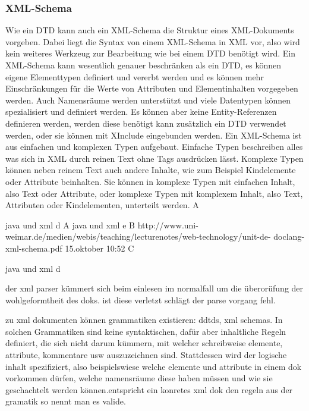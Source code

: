 \subsubsection*{XML-Schema}
Wie ein DTD kann auch ein XML-Schema die Struktur eines XML-Dokuments vorgeben. Dabei liegt die Syntax von einem XML-Schema in XML vor, also wird kein weiteres Werkzeug zur Bearbeitung wie bei einem DTD benötigt wird. Ein XML-Schema kann wesentlich genauer beschränken als ein DTD, es können eigene Elementtypen definiert und vererbt werden und es können mehr Einschränkungen für die Werte von Attributen und Elementinhalten vorgegeben werden. Auch Namensräume werden unterstützt und viele Datentypen können spezialisiert und definiert werden. Es können aber keine Entity-Referenzen definieren werden, werden diese benötigt kann zusätzlich ein DTD verwendet werden, oder sie können mit XInclude eingebunden werden. 
Ein XML-Schema ist aus einfachen und komplexen Typen aufgebaut. Einfache Typen beschreiben alles was sich in XML durch reinen Text ohne Tags ausdrücken lässt. Komplexe Typen können neben reinem Text auch andere Inhalte, wie zum Beispiel Kindelemente oder Attribute beinhalten. Sie können in komplexe Typen mit einfachen Inhalt, also Text oder Attribute, oder komplexe Typen mit komplexem Inhalt, also Text, Attributen oder Kindelementen, unterteilt werden. 
A


java und xml d A
java und xml e B
http://www.uni-weimar.de/medien/webis/teaching/lecturenotes/web-technology/unit-de-
doclang-xml-schema.pdf 15.oktober 10:52 C

java und xml d

der xml parser kümmert sich beim einlesen im normalfall um die überorüfung der wohlgeformtheit des doks. ist diese verletzt schlägt der parse vorgang fehl.

zu xml dokumenten können grammatiken existieren: ddtds, xml schemas. In solchen Grammatiken sind keine syntaktischen, dafür aber inhaltliche Regeln definiert, die sich nicht darum kümmern, mit welcher schreibweise elemente, attribute, kommentare usw auszuzeichnen sind. Stattdessen wird der logische inhalt spezifiziert, also beispielswiese welche elemente und attribute in einem dok vorkommen dürfen, welche namensräume diese haben müssen und wie sie geschachtelt werden können.entspricht ein konretes xml dok den regeln aus der gramatik so nennt man es valide. 

